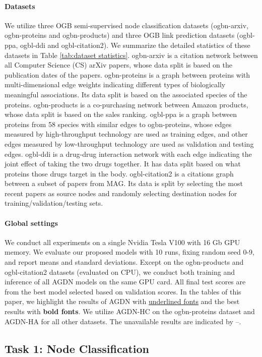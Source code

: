\documentclass{article}
\begin{document}
\paragraph{Datasets}
We utilize three OGB semi-supervised node classification datasets (ogbn-arxiv, ogbn-proteins and ogbn-products) and three OGB link prediction datasets (ogbl-ppa, ogbl-ddi and ogbl-citation2). We summarize the detailed statistics of these datasets in Table \ref{tab:dataset statistics}. ogbn-arxiv is a citation network between all Computer Science (CS) arXiv papers, whose data split is based on the publication dates of the papers. ogbn-proteins is a graph between proteins with multi-dimensional edge weights indicating different types of biologically meaningful associations. Its data split is based on the associated species of the proteins. ogbn-products is a co-purchasing network between Amazon products, whose data split is based on the sales ranking. 
ogbl-ppa is a graph between proteins from 58 species with similar edges to ogbn-proteins, whose edges measured by high-throughput technology are used as training edges, and other edges measured by low-throughput technology are used as validation and testing edges. ogbl-ddi is a drug-drug interaction network with each edge indicating the joint effect of taking the two drugs together. It has data split based on what proteins those drugs target in the body. ogbl-citation2 is a citations graph between a subset of papers from MAG. Its data is split by selecting the most recent papers as source nodes and randomly selecting destination nodes for training/validation/testing sets.

\paragraph{Global settings}
We conduct all experiments on a single Nvidia Tesla V100 with 16 Gb GPU memory. We evaluate our proposed models with 10 runs, fixing random seed 0-9, and report means and standard deviations. Except on the ogbn-products and ogbl-citation2 datasets (evaluated on CPU), we conduct both training and inference of all AGDN models on the same GPU card. All final test scores are from the best model selected based on validation scores. In the tables of this paper, we highlight the results of AGDN with \underline{underlined fonts} and the best results with \textbf{bold fonts}. We utilize AGDN-HC on the ogbn-proteins dataset and AGDN-HA for all other datasets. The unavailable results are indicated by –.

\subsection{Task 1: Node Classification}
\end{document}
